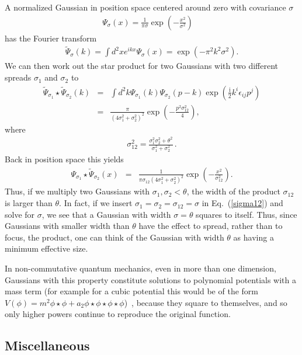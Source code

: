 \documentclass{article}
\def\beqn{\begin{eqnarray}}
\def\eeqn{\end{eqnarray}}
\begin{document}
A normalized Gaussian in position space centered around zero with covariance $\sigma$ 
\beqn
\Psi_{\sigma}(x) = \frac{1}{\pi \sigma} \exp \left( - \frac{x^2}{\sigma^2}\right) \quad
\eeqn
has the Fourier transform
\beqn
\tilde \Psi_{\sigma}(k) = \int d^2 x e^{ik x} \Psi_{\sigma}(x) = \exp \left( -  \pi^2 k^2 \sigma^2 \right) .
\eeqn
We can then work out the star product for two Gaussians with two different spreads $\sigma_1$ and $\sigma_2$ to
\beqn
\tilde \Psi_{\sigma_1} \star \tilde \Psi_{\sigma_2} (k) &=& \int d^2 k \Psi_{\sigma_1}(k) \Psi_{\sigma_2}(p-k) 
\exp \left( \frac{\mathrm{i}}{2} k^i \epsilon_{ij}p^j\right) \nonumber \\
&=& \frac{\pi}{(4 \sigma^2_1 + \sigma^2_2)^2} \exp   \left( - \frac{p^2 \sigma^2_{12}}{4}\right) ,
\eeqn
where
\beqn
\sigma^2_{12} = \frac{\sigma_1^2 \sigma_2^2 + \theta^2}{\sigma_1^2 + \sigma_2^2} \,. \label{sigma12}
\eeqn
Back in position space this yields
\beqn
\Psi_{\sigma_1} \star \tilde \Psi_{\sigma_2} (x) &=& 
\frac{1}{\pi \sigma_{12} (4 \sigma^2_1 + \sigma^2_2)^2} \exp   \left( - \frac{x^2}{\sigma^2_{12}} \right) .
\eeqn
Thus, if we multiply two Gaussians with $\sigma_1, \sigma_2 < \theta$, the width of the product $\sigma_{12}$ is
larger than $\theta$. In fact, if we insert $\sigma_1 = \sigma_2 = \sigma_{12} = \sigma$ in Eq.~(\ref{sigma12}) and
solve for $\sigma$, we see that a Gaussian with width $\sigma = \theta$ squares to itself. Thus, since Gaussians
with smaller width than $\theta$ have the effect to spread, rather than to focus, the product, one can think
of the Gaussian with width $\theta$ as having a minimum effective size. 

In non-commutative quantum mechanics, even in more than one dimension,
Gaussians with this property constitute solutions to polynomial potentials with a mass 
term (for example for a cubic potential this would be of the form $V(\phi) = m^2 \phi \star \phi + a_2 \phi \star \phi \star \phi \star \phi$)~\cite{Gopakumar:2000zd}, because they square to themselves, and so only higher powers continue to reproduce the original function. 

\subsection{Miscellaneous}
\label{motmisc}
\end{document}
